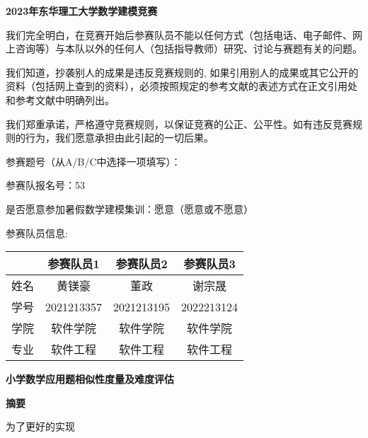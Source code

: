 \thispagestyle{empty}   %

\begin{center}
    \textbf{\fontsize{30}{1.5} 2023年东华理工大学数学建模竞赛}
\end{center}

我们完全明白，在竞赛开始后参赛队员不能以任何方式（包括电话、电子邮件、网上咨询等）与本队以外的任何人（包括指导教师）研究、讨论与赛题有关的问题。

我们知道，抄袭别人的成果是违反竞赛规则的, 如果引用别人的成果或其它公开的资料（包括网上查到的资料），必须按照规定的参考文献的表述方式在正文引用处和参考文献中明确列出。

我们郑重承诺，严格遵守竞赛规则，以保证竞赛的公正、公平性。如有违反竞赛规则的行为，我们愿意承担由此引起的一切后果。

参赛题号（从A/B/C中选择一项填写）：

参赛队报名号：53

是否愿意参加暑假数学建模集训：愿意（愿意或不愿意）\newline


{\fontsize{20}{2}参赛队员信息:}

\begin{table}[h]
    \centering
    \begin{tabular}{|c|c|c|c|}
    \hline
       & 参赛队员1      & 参赛队员2      & 参赛队员3      \\ \hline
    姓名 & 黄镁豪        & 董政         & 谢宗晟        \\ \hline
    学号 & 2021213357 & 2021213195 & 2022213124 \\ \hline
    学院 & 软件学院       & 软件学院       & 软件学院       \\ \hline
    专业 & 软件工程       & 软件工程       & 软件工程       \\ \hline
    \end{tabular}
\end{table}

%
%

\newpage
\thispagestyle{empty}

\begin{center}
    \textbf{\fontsize{20}{1.5}小学数学应用题相似性度量及难度评估}

    \textbf{摘要}
\end{center}

为了更好的实现\cite{}



\newpage
\thispagestyle{empty}
\tableofcontents